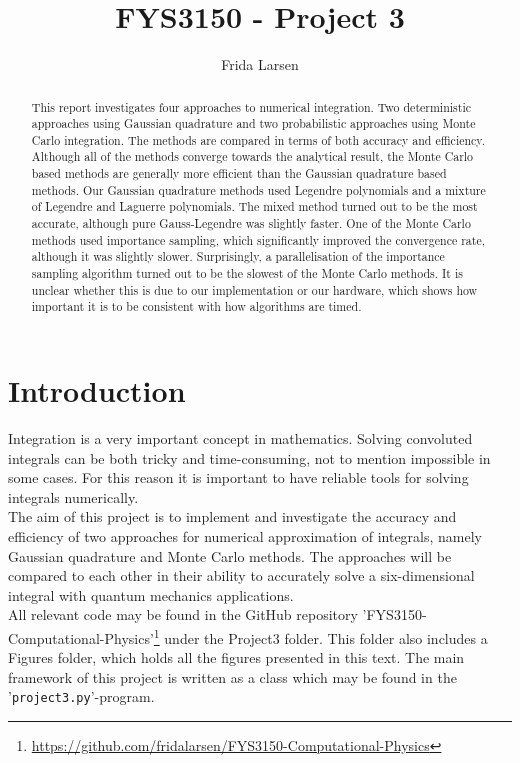 \documentclass[notitlepage, reprint, nofootinbib]{revtex4-1}
\begin{document}
\title{FYS3150 - Project 3}
\author{Frida Larsen}

\begin{abstract}
This report investigates four approaches to numerical integration. Two deterministic approaches using Gaussian quadrature and two probabilistic approaches using Monte Carlo integration. The methods are compared in terms of both accuracy and efficiency. Although all of the methods converge towards the analytical result, the Monte Carlo based methods are generally more efficient than the Gaussian quadrature based methods. Our Gaussian quadrature methods used Legendre polynomials and a mixture of Legendre and Laguerre polynomials. The mixed method turned out to be the most accurate, although pure Gauss-Legendre was slightly faster. One of the Monte Carlo methods used importance sampling, which significantly improved the convergence rate, although it was slightly slower. Surprisingly, a parallelisation of the importance sampling algorithm turned out to be the slowest of the Monte Carlo methods. It is unclear whether this is due to our implementation or our hardware, which shows how important it is to be consistent with how algorithms are timed. 
\end{abstract}

\maketitle

\section{Introduction}
Integration is a very important concept in mathematics. Solving convoluted integrals can be both tricky and time-consuming, not to mention impossible in some cases. For this reason it is important to have reliable tools for solving integrals numerically.\\[2mm]
The aim of this project is to implement and investigate the accuracy and efficiency of two approaches for numerical approximation of integrals, namely Gaussian quadrature and Monte Carlo methods. The approaches will be compared to each other in their ability to accurately solve a six-dimensional integral with quantum mechanics applications.\\[2mm]
All relevant code may be found in the GitHub repository 'FYS3150-Computational-Physics'\footnote{\href{GitHub Repository}{https://github.com/fridalarsen/FYS3150-Computational-Physics}} under the Project3 folder. This folder also includes a Figures folder, which holds all the figures presented in this text. The main framework of this project is written as a class which may be found in the '\texttt{project3.py}'-program.
\end{document}
